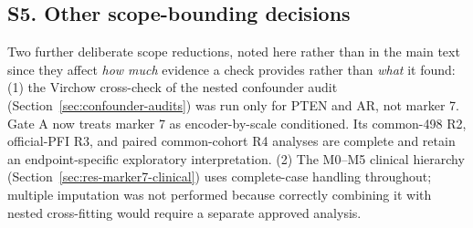 \subsection*{S5. Other scope-bounding decisions}

Two further deliberate scope reductions, noted here rather than in the main text since they
affect \emph{how much} evidence a check provides rather than \emph{what} it found: (1) the
Virchow cross-check of the nested confounder audit (Section~\ref{sec:confounder-audits}) was
run only for PTEN and AR, not marker 7. Gate A now treats marker 7 as encoder-by-scale
conditioned. Its common-498 R2, official-PFI R3, and paired common-cohort R4 analyses are
complete and retain an endpoint-specific exploratory interpretation. (2) The M0--M5 clinical
hierarchy (Section~\ref{sec:res-marker7-clinical}) uses complete-case handling throughout;
multiple imputation was not performed because correctly combining it with nested cross-fitting
would require a separate approved analysis.
